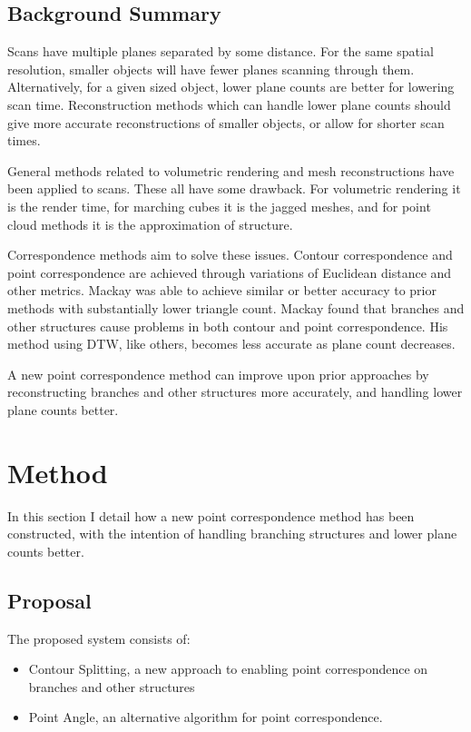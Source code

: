 \documentclass[11p, titlepage]{article}
\begin{document}
\subsection{Background Summary}

Scans have multiple planes separated by some distance. For the same spatial resolution, smaller objects will have fewer planes scanning through them. Alternatively, for a given sized object, lower plane counts are better for lowering scan time. Reconstruction methods which can handle lower plane counts should give more accurate reconstructions of smaller objects, or allow for shorter scan times.

General methods related to volumetric rendering and mesh reconstructions have been applied to scans. These all have some drawback. For volumetric rendering it is the render time, for marching cubes it is the jagged meshes, and for point cloud methods it is the approximation of structure.

Correspondence methods aim to solve these issues. Contour correspondence and point correspondence are achieved through variations of Euclidean distance and other metrics. Mackay was able to achieve similar or better accuracy to prior methods with substantially lower triangle count. Mackay found that branches and other structures cause problems in both contour and point correspondence. His method using DTW, like others, becomes less accurate as plane count decreases.

A new point correspondence method can improve upon prior approaches by reconstructing branches and other structures more accurately, and handling lower plane counts better.
\pagebreak

\section{Method}

In this section I detail how a new point correspondence method has been constructed, with the intention of handling branching structures and lower plane counts better.

\subsection{Proposal}

The proposed system consists of:
\begin{itemize}
\item Contour Splitting, a new approach to enabling point correspondence on branches and other structures
\item Point Angle, an alternative algorithm for point correspondence.
\end{itemize}
\end{document}
